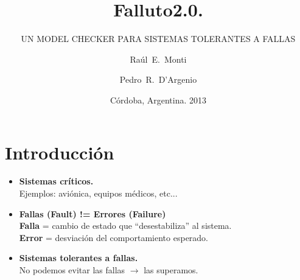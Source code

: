 \documentclass[serif]{beamer}
\title[Falluto2.0] %
{Falluto2.0.}
\subtitle{ UN MODEL CHECKER PARA SISTEMAS TOLERANTES A FALLAS}
\author[Monti] %
{Raúl~E.~Monti \and Pedro~R.~D'Argenio}
\institute[FaMAF - UNC] %
{
Facultad de Matem\'atica, Astronom\'ia y F\'isica, Universidad Nacional de 
Córdoba
}
\date[4-2-2013] %
{Córdoba, Argentina. 2013}
\begin{document}
\frame{\titlepage}


\section[Intro]{Introducción}


\begin{frame}
\begin{itemize}\itemsep15pt
\item {\Large \bfseries Sistemas críticos.}\\[5pt]
\hspace{0.5cm}Ejemplos: aviónica, equipos médicos, etc...
\item {\Large \bfseries Fallas (Fault) != Errores (Failure)}\\[5pt]
\hspace{0.5cm}\textbf{Falla} = cambio de estado que ``desestabiliza'' al sistema.\\[5pt]
\hspace{0.5cm}\textbf{Error} = desviación del comportamiento esperado.
\item {\Large \bfseries Sistemas tolerantes a fallas.}\\[5pt]
\hspace{0.5cm}No podemos evitar las fallas $\longrightarrow$ las superamos.
\end{itemize}
\end{frame}
\end{document}
